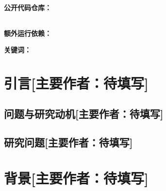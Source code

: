 \documentclass[UTF8,11pt,a4paper,fontset=none]{ctexart}
\author{
  \todoitem{成员姓名 1}\quad
  \todoitem{成员姓名 2}\quad
  \todoitem{成员姓名 3}\\
  \small Machine Learning Essentials, Summer Semester 2026
}
\date{\today}
\newcommand{\primaryauthor}[1]{\texorpdfstring{\enspace\normalfont\small[主要作者：#1]}{ [主要作者：#1]}}
\newcommand{\authorsection}[2]{\section{#1\primaryauthor{#2}}}
\newcommand{\authorsubsection}[2]{\subsection{#1\primaryauthor{#2}}}
\newcommand{\pendingauthor}{待填写}
\newif\ifdraftguidance
\newcommand{\writingnote}[1]{%
  \ifdraftguidance
    \par\noindent\begingroup\color{promptblue}\small
    \fbox{\begin{minipage}{0.94\linewidth}\textbf{写作提示：}#1\end{minipage}}%
    \par\endgroup
  \fi
}
\newcommand{\todoitem}[1]{%
  \ifdraftguidance\textcolor{promptblue}{\textbf{[待补：#1]}}\fi
}
\begin{document}
\maketitle

\writingnote{提交前确认课程是否接受中文及其字数折算规则。课程要求的总篇幅约为每名成员 4,000 English words，且不应明显超出。报告中不要使用大学 Logo。}

\begin{center}
  \textbf{公开代码仓库：}\todoitem{公开仓库 URL}\\
  \textbf{额外运行依赖：}\todoitem{没有则写“无”；有则列名称与版本}
\end{center}

\begin{abstract}
\writingnote{用一段自洽文字概括大纲中的研究问题、三条模型路线、统一冻结评估方法、最重要的定量结果，以及为什么最终选择 B33。最后写清结论只适用于已运行协议；不要引用文献，也不要加入正文未报告的结果。}
\todoitem{摘要正文}
\end{abstract}

\noindent\textbf{关键词：}\todoitem{3--5 个关键词}

\tableofcontents
\clearpage

\writingnote{提交检查：摘要和 Background 使用完整正文，不保留提示或示意图占位；报告开头列出最终 Agent 的 NumPy 与 PyTorch 版本；所有标题填写真实主要作者；所有数字可追溯到 report-assets/tables/*.csv 或其 source\_path；not\_reported 和 unrun 不转换为 0；报告 PDF 不上传公开仓库；团队成员须理解、核验并以自己的表达修订 AI 辅助初稿。}

\authorsection{引言}{\pendingauthor}

\authorsubsection{问题与研究动机}{\pendingauthor}
\writingnote{说明稀疏反馈、延迟炸弹信用、目标重选和对手不确定性；强调训练 reward 不等于冻结游戏表现，得分、安全和 0.5 秒 CPU 时限共同决定选模。}
\todoitem{正文}

\authorsubsection{研究问题}{\pendingauthor}
\writingnote{依次回答：不同价值学习方法能否学会金币导航并迁移到炸箱和对战；等待、循环、自杀和目标丢失分别能由哪些特征、奖励和生存约束改善；三条路线的主要瓶颈及哪些改进有效、无效或证据不足；在得分、生存、推理时间和可复现性之间为什么最终选择 B33。}
\todoitem{正文}

\authorsection{背景}{\pendingauthor}
\writingnote{描述 Bomberman 环境与 Task 1--4；概述 Q-learning、Double Q、DQN、Double DQN、dueling、PER、n-step 与蒸馏；介绍离散、tile-coded 连续、MLP 连续和 17 通道空间表示；说明奖励塑形、课程学习与安全动作准入。}
\todoitem{正文}
\end{document}
